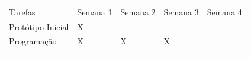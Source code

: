 \begin{longtable}[c]{@{}lllll@{}}
\toprule\addlinespace
\begin{minipage}[b]{0.39\columnwidth}\raggedright
Tarefas
\end{minipage} & \begin{minipage}[b]{0.12\columnwidth}\raggedright
Semana 1
\end{minipage} & \begin{minipage}[b]{0.12\columnwidth}\raggedright
Semana 2
\end{minipage} & \begin{minipage}[b]{0.12\columnwidth}\raggedright
Semana 3
\end{minipage} & \begin{minipage}[b]{0.12\columnwidth}\raggedright
Semana 4
\end{minipage}
\\\addlinespace
\midrule\endhead
\begin{minipage}[t]{0.39\columnwidth}\raggedright
Protótipo Inicial
\end{minipage} & \begin{minipage}[t]{0.12\columnwidth}\raggedright
X
\end{minipage} & \begin{minipage}[t]{0.12\columnwidth}\raggedright
\end{minipage} & \begin{minipage}[t]{0.12\columnwidth}\raggedright
\end{minipage} & \begin{minipage}[t]{0.12\columnwidth}\raggedright
\end{minipage}
\\\addlinespace
\begin{minipage}[t]{0.39\columnwidth}\raggedright
Programação
\end{minipage} & \begin{minipage}[t]{0.12\columnwidth}\raggedright
X
\end{minipage} & \begin{minipage}[t]{0.12\columnwidth}\raggedright
X
\end{minipage} & \begin{minipage}[t]{0.12\columnwidth}\raggedright
X
\end{minipage} & \begin{minipage}[t]{0.12\columnwidth}\raggedright
\end{minipage}
\\\addlinespace
\begin{minipage}[t]{0.39\columnwidth}\raggedright

\end{minipage}
\end{longtable}
